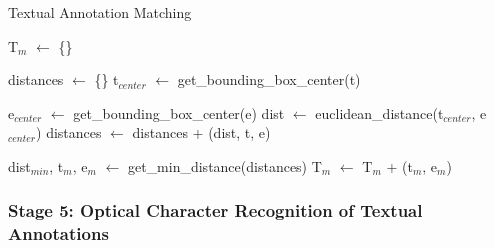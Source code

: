 \begin{algorithm}[H]
\caption{Textual Annotation Matching}\label{alg:text_matching}
\SetAlgoLined



T$_m$ $\gets$ \{\}\;
 {
    distances $\gets$ \{\}\;
    t$_{center}$ $\gets$ get\_bounding\_box\_center(t)\;

     {
        e$_{center}$ $\gets$ get\_bounding\_box\_center(e)\;
        dist $\gets$ euclidean\_distance(t$_{center}$, e$_{center}$)\;
        distances $\gets$ distances + (dist, t, e)\;
    }

    dist$_{min}$, t$_m$, e$_m$ $\gets$ get\_min\_distance(distances)\;
    T$_m$ $\gets$ T$_m$ + (t$_m$, e$_m$)\;
}

\end{algorithm}



\subsubsection{Stage 5: Optical Character Recognition of Textual Annotations}

